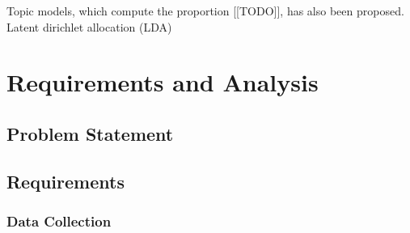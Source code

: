 \documentclass{report}
\begin{document}
Topic models, which compute the proportion [[TODO]], has also been proposed. %
Latent dirichlet allocation (LDA) %




\chapter{Requirements and Analysis}  %

\section{Problem Statement}


\section{Requirements}



\subsection{Data Collection}  %
\end{document}
